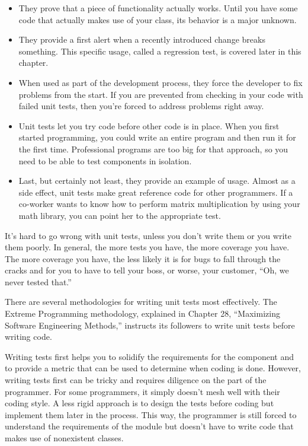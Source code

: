 \begin{itemize}
\item
They prove that a piece of functionality actually works. Until you have some code that actually makes use of your class, its behavior is a major unknown.

\item
They provide a first alert when a recently introduced change breaks something. This specific usage, called a regression test, is covered later in this chapter.

\item
When used as part of the development process, they force the developer to fix problems from the start. If you are prevented from checking in your code with failed unit tests, then you’re forced to address problems right away.

\item
Unit tests let you try code before other code is in place. When you first started programming, you could write an entire program and then run it for the first time. Professional programs are too big for that approach, so you need to be able to test components in isolation.

\item
Last, but certainly not least, they provide an example of usage. Almost as a side effect, unit tests make great reference code for other programmers. If a co-worker wants to know how to perform matrix multiplication by using your math library, you can point her to the appropriate test.
\end{itemize}


It’s hard to go wrong with unit tests, unless you don’t write them or you write them poorly. In general, the more tests you have, the more coverage you have. The more coverage you have, the less likely it is for bugs to fall through the cracks and for you to have to tell your boss, or worse, your customer, “Oh, we never tested that.”

There are several methodologies for writing unit tests most effectively. The Extreme Programming methodology, explained in Chapter 28, “Maximizing Software Engineering Methods,” instructs its followers to write unit tests before writing code.

Writing tests first helps you to solidify the requirements for the component and to provide a metric that can be used to determine when coding is done. However, writing tests first can be tricky and requires diligence on the part of the programmer. For some programmers, it simply doesn’t mesh well with their coding style. A less rigid approach is to design the tests before coding but implement them later in the process. This way, the programmer is still forced to understand the requirements of the module but doesn’t have to write code that makes use of nonexistent classes.

